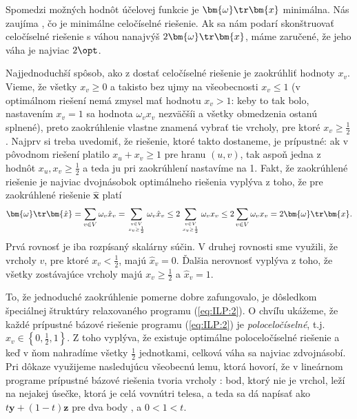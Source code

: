 \noindent Spomedzi možných hodnôt účelovej funkcie je $\bm{\omega}\tr\bm{x}$
minimálna. Nás zaujíma \opt, čo je minimálne celočíselné riešenie. Ak sa nám
podarí skonštruovať celočíselné riešenie s váhou nanajvýš
$2\bm{\omega}\tr\bm{x}$, máme zaručené, že jeho váha je najviac $2\opt$.

\noindent Najjednoduchší spôsob, ako z  dostať celočíselné riešenie je
zaokrúhliť hodnoty $x_v$. Vieme, že všetky $x_v\ge 0$ a takisto bez ujmy na
všeobecnosti $x_v\le 1$ (v optimálnom riešení nemá zmysel mať hodnotu $x_v>1$:
keby to tak bolo, nastavením $x_v=1$ sa hodnota $\omega_vx_v$ nezväčšíi a
všetky obmedzenia ostanú splnené), preto zaokrúhlenie vlastne znamená vybrať
tie vrcholy, pre ktoré $x_v\ge\frac{1}{2}$.  Najprv si treba uvedomiť, že
riešenie, ktoré takto dostaneme, je prípustné: ak v pôvodnom riešení platilo
$x_u+x_v\ge1$ pre hranu $(u,v)$, tak aspoň jedna z hodnôt
$x_u,x_v\ge\frac{1}{2}$ a teda ju pri zaokrúhlení nastavíme na 1. Fakt, že
zaokrúhlené riešenie je najviac dvojnásobok optimálneho riešenia vyplýva z
toho, že pre zaokrúhlené riešenie $\bm{\hat{x}}$ platí
$$\bm{\omega}\tr\bm{\hat{x}}=\sum_{v\in V}\omega_v\hat{x}_v=\sum_{v\in V\atop
x_v\ge\frac{1}{2}}\omega_v\hat{x}_v \le2\sum_{v\in V\atop
x_v\ge\frac{1}{2}}\omega_v x_v\le2\sum_{v\in
V}\omega_vx_v=2\bm{\omega}\tr\bm{x}.$$ Prvá rovnosť je iba rozpísaný skalárny
súčin. V druhej rovnosti sme využili, že vrcholy $v$, pre ktoré
$x_v<\frac{1}{2}$, majú $\hat{x}_v=0$.  Ďalšia nerovnosť vyplýva z toho, že
všetky zostávajúce vrcholy majú $x_v\ge\frac{1}{2}$ a $\hat{x}_v=1$.


\noindent
To, že jednoduché zaokrúhlenie pomerne dobre zafungovalo, je dôsledkom 
špeciálnej štruktúry relaxovaného programu   (\ref{eq:ILP:2}). O  chvíľu ukážeme, že každé
prípustné bázové riešenie programu (\ref{eq:ILP:2}) je {\em poloceločíselné},
t.j.  $x_v\in\left\{0,\frac{1}{2},1\right\}$. Z toho vyplýva, že existuje
optimálne poloceločíselné riešenie a keď v ňom nahradíme všetky $\frac{1}{2}$
jednotkami, celková váha sa najviac zdvojnásobí. 
Pri dôkaze využijeme nasledujúcu všeobecnú lemu, ktorá hovorí, že v lineárnom 
programe prípustné bázové
riešenia tvoria vrcholy \dom: bod, ktorý nie je vrchol, leží na nejakej úsečke, ktorá
je celá vovnútri telesa, a teda sa dá napísať ako $t\bm{y}+(1-t)\bm{z}$ pre dva body
,  a $0<1<t$.

